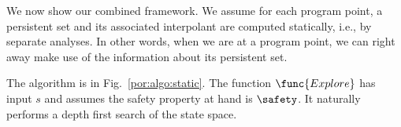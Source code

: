 We now show our combined framework.
We assume for each program point, a persistent set and its associated interpolant 
are computed statically, 
i.e., by separate analyses.
In other words, when we are at a program point, we can right away make use of 
the information about its persistent set.




The algorithm is in Fig.~\ref{por:algo:static}. 
The function $\func{Explore}$ has input $s$ and 
assumes the safety property at hand is $\safety$.
It naturally performs a depth first search of the state space.

